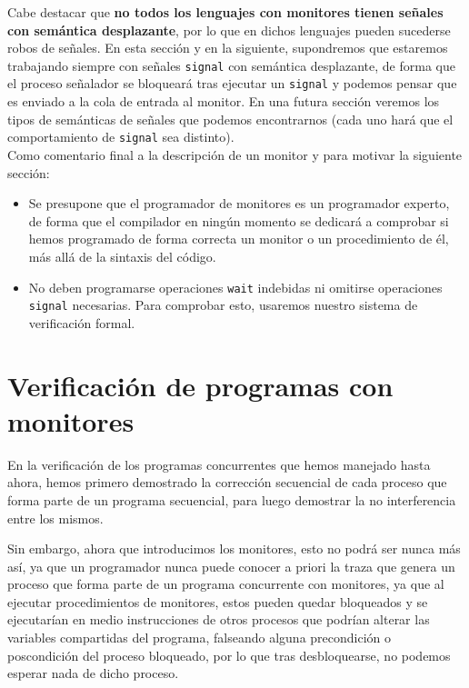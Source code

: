 Cabe destacar que \textbf{no todos los lenguajes con monitores tienen señales con semántica desplazante}, por lo que en dichos lenguajes pueden sucederse robos de señales. En esta sección y en la siguiente, supondremos que estaremos trabajando siempre con señales \verb|signal| con semántica desplazante, de forma que el proceso señalador se bloqueará tras ejecutar un \verb|signal| y podemos pensar que es enviado a la cola de entrada al monitor. En una futura sección veremos los tipos de semánticas de señales que podemos encontrarnos (cada uno hará que el comportamiento de \verb|signal| sea distinto).\\

\noindent
Como comentario final a la descripción de un monitor y para motivar la siguiente sección:
\begin{itemize}
    \item Se presupone que el programador de monitores es un programador experto, de forma que el compilador en ningún momento se dedicará a comprobar si hemos programado de forma correcta un monitor o un procedimiento de él, más allá de la sintaxis del código.
    \item No deben programarse operaciones \verb|wait| indebidas ni omitirse operaciones \verb|signal| necesarias. Para comprobar esto, usaremos nuestro sistema de verificación formal.
\end{itemize}

\section{Verificación de programas con monitores}
En la verificación de los programas concurrentes que hemos manejado hasta ahora, hemos primero demostrado la corrección secuencial de cada proceso que forma parte de un programa secuencial, para luego demostrar la no interferencia entre los mismos. 

Sin embargo, ahora que introducimos los monitores, esto no podrá ser nunca más así, ya que un programador nunca puede conocer a priori la traza que genera un proceso que forma parte de un programa concurrente con monitores, ya que al ejecutar procedimientos de monitores, estos pueden quedar bloqueados y se ejecutarían en medio instrucciones de otros procesos que podrían alterar las variables compartidas del programa, falseando alguna precondición o poscondición del proceso bloqueado, por lo que tras desbloquearse, no podemos esperar nada de dicho proceso.\\

